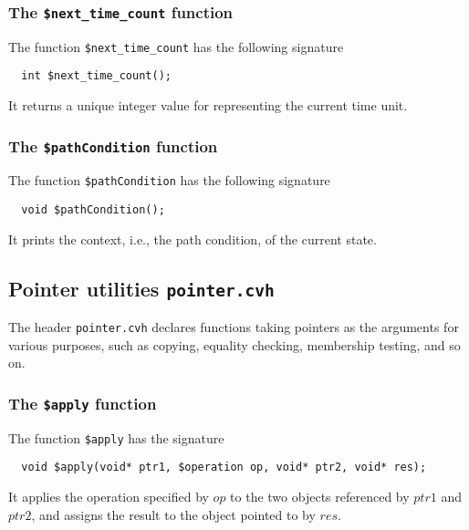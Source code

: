 \subsubsection{The \texttt{\$next\_time\_count} function}
The function \texttt{\$next\_time\_count} has the following signature
\begin{verbatim}
  int $next_time_count();
\end{verbatim}
It returns a unique integer value for representing the current time unit. 

\subsubsection{The \texttt{\$pathCondition} function}
The function \texttt{\$pathCondition} has the following signature
\begin{verbatim}
  void $pathCondition();
\end{verbatim}
It prints the context, i.e., the path condition, of the current state.

\subsection{Pointer utilities \texttt{pointer.cvh}}
\label{subsec:pointerLibrary}
The header \texttt{pointer.cvh} declares functions taking pointers as the arguments for various purposes,
such as copying, equality checking, membership testing, and so on.

\subsubsection{The \texttt{\$apply} function}
The function \texttt{\$apply} has the signature
\begin{verbatim}
  void $apply(void* ptr1, $operation op, void* ptr2, void* res);
\end{verbatim}
It applies the operation specified by $op$ to the two objects referenced by $ptr1$ and
$ptr2$, and assigns the result to the object pointed to by $res$.

